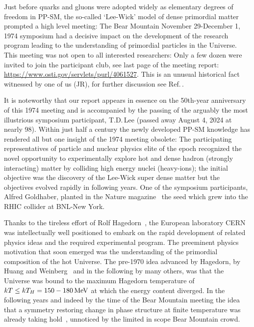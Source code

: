  Just before quarks and gluons were adopted widely as elementary degrees of freedom in PP-SM, the so-called `Lee-Wick' model of dense primordial matter prompted a high level meeting: The Bear Mountain November 29-December 1, 1974 symposium had a decisive impact on the development of the research program leading to the understanding of primordial particles in the Universe. This meeting was not open to all interested researchers: Only a few dozen were invited to join the participant club, see last page of the meeting report: \url{https://www.osti.gov/servlets/purl/4061527}. This is an unusual historical fact witnessed by one of us (JR), for further discussion see Ref.\,\cite{Rafelski:2019twp}.

It is noteworthy that our report appears in essence on the 50th-year anniversary of this 1974 meeting and is accompanied by the passing of the arguably the most illustrious symposium participant, T.D.\,Lee (passed away August 4, 2024 at nearly 98). Within just half a century the newly developed PP-SM knowledge has rendered all but one insight of the 1974 meeting obsolete: The participating representatives of particle and nuclear physics elite of the epoch recognized the novel opportunity to experimentally explore hot and dense hadron (strongly interacting) matter by colliding high energy nuclei (heavy-ions); the initial objective was the discovery of the Lee-Wick super dense matter but the objectives evolved rapidly in following years. One of the symposium participants, Alfred Goldhaber, planted in the Nature magazine~\cite{Goldhaber:1978qp} the seed which grew into the RHIC collider at BNL-New York. 

 Thanks to the tireless effort of Rolf Hagedorn~\cite{Rafelski:2016hnq}, the European laboratory CERN was intellectually well positioned to embark on the rapid development of related physics ideas and the required experimental program. The preeminent physics motivation that soon emerged was the understanding of the primordial composition of the hot Universe. The pre-1970 idea advanced by Hagedorn, by Huang and Weinberg~\cite{Huang:1970iq} and in the following by many others, was that the Universe was bound to the maximum Hagedorn temperature of $kT\le kT_H=150-180\text{\,MeV}$ at which the energy content diverged. In the following years and indeed by the time of the Bear Mountain meeting the idea that a symmetry restoring change in phase structure at finite temperature was already taking hold~\cite{Weinberg:1974hy,Harrington:1974fc}, unnoticed by the limited in scope Bear Mountain crowd.

